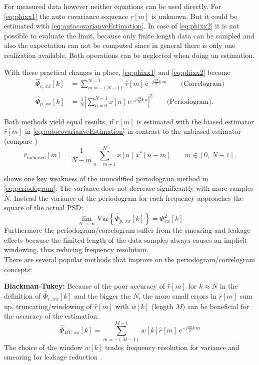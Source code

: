 For measured data however neither equations can be used directly.
For \autoref{eq:phixx1} the auto covariance sequence $r[m]$ is unknown.
But it could be estimated with \autoref{eq:autocovarianveEstimation}. In case of \autoref{eq:phixx2} it is not possible to evaluate the limit, because only finite length data can be sampled and also the expectation can not be computed since in general there is only one realization available. Both operations can be neglected when doing an estimation.

With these practical changes in place, \autoref{eq:phixx1} and \autoref{eq:phixx2} become
\begin{align}
\hat{\Phi}_{c,\,xx}[k] &= \sum_{m=-(N-1)}^{N-1} \hat{r}[m]\,\text{e}^{-j\frac{2\pi}{N}k\,m} \label{eq:phiCxx1}\qquad\text{(Correlogram)}\\
\hat{\Phi}_{p,\,xx}[k] &= \frac{1}{N} \left| \sum_{n=0}^{N-1} x[n]\,\text{e}^{-j\frac{2\pi}{N}k\,n}\right|^2\qquad\text{(Periodogram)}\label{eq:periodogram}.
\end{align}

Both methods yield equal results, if $r[m]$ is estimated with the biased estimator $\hat{r}[m]$ in \autoref{eq:autocovarianveEstimation} in contrast to the unbiased estimator (compare \cite[p.~24]{Stoica1997})
\begin{equation}
\hat{r}_{\text{unbiased}}[m] = \frac{1}{N-m} \sum_{n=m+1}^{N} x[n]\,x^\ast[n-m]\qquad m \in [0,\,N-1].
\end{equation}

\cite{Rowell2008} shows one key weakness of the unmodified periodogram method in \autoref{eq:periodogram}: The variance does not decrease significantly with more samples $N$. Instead the variance of the periodogram for each frequency approaches the square of the actual PSD:
\begin{equation}
\lim_{N\rightarrow\infty} \text{Var}\left\{\hat{\Phi}_{p,\,xx}[k]\right\} = \Phi_{xx}^2[k]
\end{equation}
Furthermore the periodogram/correlogram suffer from the smearing and leakage effects because the limited length of the data samples always causes an implicit windowing, thus reducing frequency resolution.\\

There are several popular methods that improve on the periodogram/correlogram concepts:

\textbf{Blackman-Tukey:} Because of the poor accuracy of $\hat{r}[m]$ for $k\approx N$ in the definition of $\hat{\Phi}_{c,\,xx}[k]$ and the bigger the $N$, the more small errors in $\hat{r}[m]$ sum up, truncating/windowing of $\hat{r}[m]$ with $w[k]$ (length $M$) can be beneficial for the accuracy of the estimation.
\begin{equation}
\hat{\Phi}_{BT,\,xx}[k] = \sum_{m=-(M-1)}^{M-1} w[k]\hat{r}[m]\,\text{e}^{-j\frac{2\pi}{N}k\,m}
\end{equation}
The choice of the window $w[k]$ trades frequency resolution for variance and smearing for leakage reduction \cite[p.~41]{Stoica1997}.

